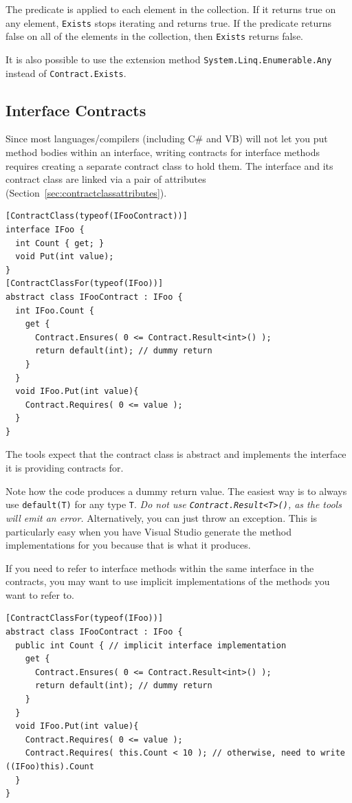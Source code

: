 \documentclass{article}
\newcommand{\code}[1]{\lstinline{#1}}
\newcommand{\csharp}{C\#}
\begin{document}
The predicate is applied to each
element in the collection. If it returns true on any element, \code{Exists}
stops iterating and returns true. If the predicate returns false on
all of the elements in the collection, then \code{Exists} returns
false.

It is also possible to use the extension method
\code{System.Linq.Enumerable.Any} instead of
\code{Contract.Exists}.

\subsection{Interface Contracts}
\label{sec:interfacecontracts}
Since most languages/compilers (including \csharp{} and VB) will not let you put
method bodies within an interface, writing contracts for interface
methods requires creating a separate contract class to hold them. The interface and
its contract class are linked via a pair of attributes
(Section~\ref{sec:contractclassattributes}).
\begin{lstlisting}
[ContractClass(typeof(IFooContract))]
interface IFoo {
  int Count { get; } 
  void Put(int value);
}
[ContractClassFor(typeof(IFoo))]
abstract class IFooContract : IFoo { 
  int IFoo.Count { 
    get { 
      Contract.Ensures( 0 <= Contract.Result<int>() ); 
      return default(int); // dummy return
    }
  }
  void IFoo.Put(int value){
    Contract.Requires( 0 <= value ); 
  }
}
\end{lstlisting}
The tools expect that the contract class is abstract and implements the interface it
is providing contracts for.

Note how the code produces a dummy return value. The easiest way is
to always use \lstinline{default(T)} for any type \lstinline{T}. 
\emph{Do not use \lstinline{Contract.Result<T>()}, as the tools will emit
an error.}
Alternatively, you can just throw an exception. This is particularly easy 
when you have Visual Studio generate the method implementations for you because
that is what it produces.

If you need to refer to interface methods within the same interface in
the contracts, you may want to use implicit implementations of the
methods you want to refer to.
\begin{lstlisting}
[ContractClassFor(typeof(IFoo))]
abstract class IFooContract : IFoo { 
  public int Count { // implicit interface implementation
    get { 
      Contract.Ensures( 0 <= Contract.Result<int>() ); 
      return default(int); // dummy return
    }
  }
  void IFoo.Put(int value){
    Contract.Requires( 0 <= value ); 
    Contract.Requires( this.Count < 10 ); // otherwise, need to write ((IFoo)this).Count
  }
}
\end{lstlisting}
\end{document}
